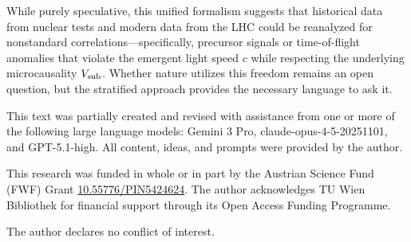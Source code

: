 \documentclass[aps,prd,twocolumn,nofootinbib,superscriptaddress]{revtex4-2}
\begin{document}
While purely speculative, this unified formalism suggests that historical data from nuclear tests and modern data from the LHC could be reanalyzed for nonstandard correlations---specifically, precursor signals or time-of-flight anomalies that violate the emergent light speed $c$ while respecting the underlying microcausality $V_{\rm sub}$. Whether nature utilizes this freedom remains an open question, but the stratified approach provides the necessary language to ask it.

\begin{acknowledgments}
This text was partially created and revised with assistance from one or more of the following large language models: Gemini 3 Pro, claude-opus-4-5-20251101, and GPT-5.1-high. All content, ideas, and prompts were provided by the author.

This research was funded in whole or in part by the Austrian Science Fund (FWF) Grant \href{https://doi.org/10.55776/PIN5424624}{10.55776/PIN5424624}.
The author acknowledges TU Wien Bibliothek for financial support through its Open Access Funding Programme.

The author declares no conflict of interest.
\end{acknowledgments}


\end{document}
